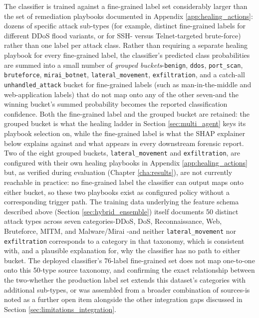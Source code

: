 The classifier is trained against a fine-grained label set considerably larger than the set of remediation playbooks documented in Appendix \ref{app:healing_actions}: dozens of specific attack sub-types (for example, distinct fine-grained labels for different DDoS flood variants, or for SSH- versus Telnet-targeted brute-force) rather than one label per attack class. Rather than requiring a separate healing playbook for every fine-grained label, the classifier's predicted class probabilities are summed into a small number of \textit{grouped buckets}-\texttt{benign}, \texttt{ddos}, \texttt{port\_scan}, \texttt{bruteforce}, \texttt{mirai\_botnet}, \texttt{lateral\_movement}, \texttt{exfiltration}, and a catch-all \texttt{unhandled\_attack} bucket for fine-grained labels (such as man-in-the-middle and web-application labels) that do not map onto any of the other seven-and the winning bucket's summed probability becomes the reported classification confidence. Both the fine-grained label and the grouped bucket are retained: the grouped bucket is what the healing ladder in Section \ref{sec:multi_agent} keys its playbook selection on, while the fine-grained label is what the SHAP explainer below explains against and what appears in every downstream forensic report. Two of the eight grouped buckets, \texttt{lateral\_movement} and \texttt{exfiltration}, are configured with their own healing playbooks in Appendix \ref{app:healing_actions} but, as verified during evaluation (Chapter \ref{cha:results}), are not currently reachable in practice: no fine-grained label the classifier can output maps onto either bucket, so these two playbooks exist as configured policy without a corresponding trigger path. The training data underlying the feature schema described above (Section \ref{sec:hybrid_ensemble}) itself documents 50 distinct attack types across seven categories-DDoS, DoS, Reconnaissance, Web, Bruteforce, MITM, and Malware/Mirai \cite{Firouzi2025}-and neither \texttt{lateral\_movement} nor \texttt{exfiltration} corresponds to a category in that taxonomy, which is consistent with, and a plausible explanation for, why the classifier has no path to either bucket. The deployed classifier's 76-label fine-grained set does not map one-to-one onto this 50-type source taxonomy, and confirming the exact relationship between the two-whether the production label set extends this dataset's categories with additional sub-types, or was assembled from a broader combination of sources-is noted as a further open item alongside the other integration gaps discussed in Section \ref{sec:limitations_integration}.

